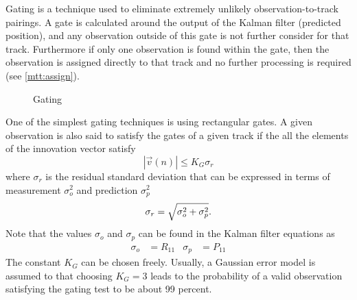 Gating is a technique used to eliminate extremely unlikely observation-to-track pairings. A gate is calculated around the output of the Kalman filter (predicted position), and any observation outside of this gate is not further consider for that track. Furthermore if only one observation is found within the gate, then the observation is assigned directly to that track and no further processing is required (see \cref{mtt:assign}). 

\begin{figure}[h]
	\centering
	
	\caption{Gating}
	\label{fig:gating}
\end{figure} 


One of the simplest gating techniques is using rectangular gates. A given observation is also said to satisfy the gates of a given track if the all the elements of the innovation vector satisfy 
\begin{equation}
	|\vec{v}(n)| \leq K_G \sigma_r
\end{equation}
where $\sigma_r$ is the residual standard deviation that can be expressed in terms of measurement $\sigma_o^2$ and prediction $\sigma_p^2$
\begin{equation}
	\sigma_r = \sqrt{\sigma_o^2 +\sigma_p^2}\\.
\end{equation}
Note that the values $\sigma_o$ and $\sigma_p$ can be found in the Kalman filter equations as 
\begin{align}
	\sigma_o &= R_{11} & \sigma_p &= P_{11}
\end{align}
The constant $K_G$ can be chosen freely. Usually, a Gaussian error model is assumed to that choosing $K_G = 3$ leads to the probability of a valid observation  satisfying the gating test to be about 99 percent. 